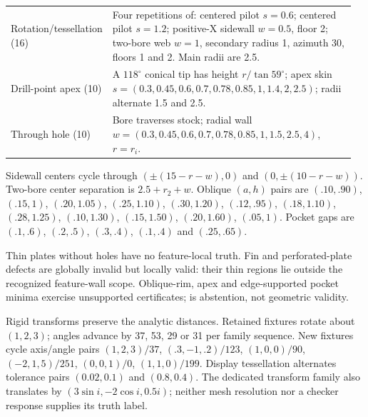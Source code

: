 \begin{longtable}{@{}p{0.25\linewidth}p{0.71\linewidth}@{}}
Rotation/tessellation (16) & Four repetitions of: centered pilot $s=0.6$; centered pilot $s=1.2$; positive-X sidewall $w=0.5$, floor 2; two-bore web $w=1$, secondary radius 1, azimuth 30, floors 1 and 2. Main radii are 2.5.\\
Drill-point apex (10) & A $118^\circ$ conical tip has height $r/\tan59^\circ$; apex skin $s=(0.3,0.45,0.6,0.7,0.78,0.85,1,1.4,2,2.5)$; radii alternate 1.5 and 2.5.\\
Through hole (10) & Bore traverses stock; radial wall $w=(0.3,0.45,0.6,0.7,0.78,0.85,1,1.5,2.5,4)$, $r=r_i$.\\
\end{longtable}
\endgroup

Sidewall centers cycle through $(\pm(15-r-w),0)$ and $(0,\pm(10-r-w))$. Two-bore center separation is $2.5+r_2+w$. Oblique $(a,h)$ pairs are $(.10,.90)$, $(.15,1)$, $(.20,1.05)$, $(.25,1.10)$, $(.30,1.20)$, $(.12,.95)$, $(.18,1.10)$, $(.28,1.25)$, $(.10,1.30)$, $(.15,1.50)$, $(.20,1.60)$, $(.05,1)$. Pocket gaps are $(.1,.6)$, $(.2,.5)$, $(.3,.4)$, $(.1,.4)$ and $(.25,.65)$.

Thin plates without holes have no feature-local truth. Fin and perforated-plate defects are globally invalid but locally valid: their thin regions lie outside the recognized feature-wall scope. Oblique-rim, apex and edge-supported pocket minima exercise unsupported certificates;  is abstention, not geometric validity.

Rigid transforms preserve the analytic distances. Retained fixtures rotate about $(1,2,3)$; angles advance by 37, 53, 29 or 31 per family sequence. New fixtures cycle axis/angle pairs $(1,2,3)/37$, $(.3,-1,.2)/123$, $(1,0,0)/90$, $(-2,1,5)/251$, $(0,0,1)/0$, $(1,1,0)/199$. Display tessellation alternates tolerance pairs $(0.02,0.1)$ and $(0.8,0.4)$. The dedicated transform family also translates by $(3\sin i,-2\cos i,0.5i)$; neither mesh resolution nor a checker response supplies its truth label.
